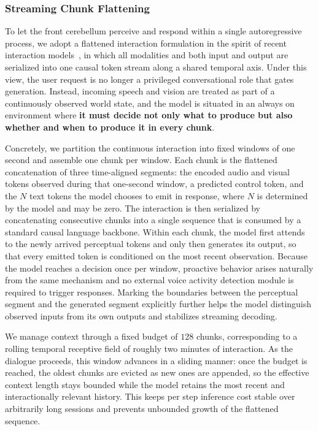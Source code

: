 \subsubsection{Streaming Chunk Flattening} \label{jsp:2}


To let the front cerebellum perceive and respond within a single autoregressive process, we adopt a flattened interaction formulation in the spirit of recent interaction models~\cite{thinkingmachines2026interactionmodels}, in which all modalities and both input and output are serialized into one causal token stream along a shared temporal axis. Under this view, the user request is no longer a privileged conversational role that gates generation. Instead, incoming speech and vision are treated as part of a continuously observed world state, and the model is situated in an always on environment where \textbf{it must decide not only what to produce but also whether and when to produce it in every chunk}.

Concretely, we partition the continuous interaction into fixed windows of one second and assemble one chunk per window. Each chunk is the flattened concatenation of three time-aligned segments: the encoded audio and visual tokens observed during that one-second window, a predicted control token, and the $N$ text tokens the model chooses to emit in response, where $N$ is determined by the model and may be zero. The interaction is then serialized by concatenating consecutive chunks into a single sequence that is consumed by a standard causal language backbone. Within each chunk, the model first attends to the newly arrived perceptual tokens and only then generates its output, so that every emitted token is conditioned on the most recent observation. Because the model reaches a decision once per window, proactive behavior arises naturally from the same mechanism and no external voice activity detection module is required to trigger responses. Marking the boundaries between the perceptual segment and the generated segment explicitly further helps the model distinguish observed inputs from its own outputs and stabilizes streaming decoding.

We manage context through a fixed budget of $128$ chunks, corresponding to a rolling temporal receptive field of roughly two minutes of interaction. As the dialogue proceeds, this window advances in a sliding manner: once the budget is reached, the oldest chunks are evicted as new ones are appended, so the effective context length stays bounded while the model retains the most recent and interactionally relevant history. This keeps per step inference cost stable over arbitrarily long sessions and prevents unbounded growth of the flattened sequence.

